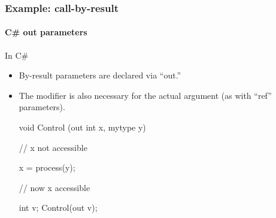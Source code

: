 \documentclass{beamer}
\begin{document}
\begin{frame}[fragile]
\frametitle{Example: call-by-result}
\framesubtitle{C\# out parameters}
In C\# 
\begin{itemize}
\item By-result parameters are declared via ``out.'' 
\item The modifier 
is also necessary for the actual argument
(as with ``ref'' parameters).

\begin{cplus3}
void Control (out int x, mytype y)
{
     // x not accessible

     x = process(y);
  
     // now x accessible    
}

int v;
Control(out v);
\end{cplus3}
\end{itemize}
\end{frame}
\end{document}

